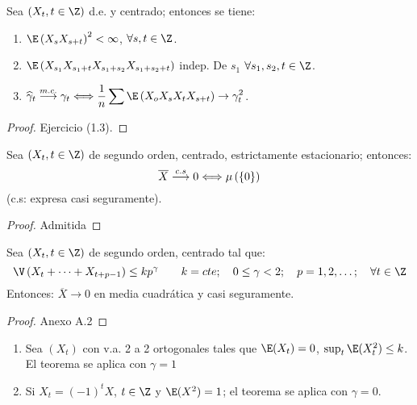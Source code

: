 \begin{teorema}
 Sea $\left( X_{t} ,t\in \Z \right)$ d.e. y centrado; entonces se tiene:
\begin{enumerate}
 \item $\E\left( {X_{s} X_{s+t} } \right)^{2}<\infty $, $\forall 
s,t\in \Z$.

\item $\E\left(X_{s_{1} } X_{s_{1} +t} X_{s_{1} +s_{2} } X_{s_{1} 
+s_{2} +t} \right)$ indep. De $s_{1}$ $ \forall s_{1} ,s_{2} 
,t\in \Z$.

\item $\displaystyle\widehat{\gamma}_{t} \buildrel {m.c.} \over 
\longrightarrow \gamma_{t} \Longleftrightarrow \frac{1}{n}\sum 
{\E\left( {X_{o} X_{s} X_{t} X_{s+t} } \right)\to \gamma_{t}^{2} } $.
\end{enumerate}
\end{teorema}

\begin{proof}
 Ejercicio (1.3).
\end{proof}

\begin{teorema}
Sea $\left( X_{t} ,t\in \Z \right)$ de segundo orden, centrado, estrictamente estacionario; entonces:
\[
\overline{X}\buildrel {c.s} \over \longrightarrow 0\Longleftrightarrow \mu \left( 
\left\{ 0 \right\} \right)
\]
(c.s: expresa casi seguramente).
\end{teorema}

\begin{proof}
 Admitida
\end{proof}


\begin{teorema}
Sea $\left(X_{t} ,t\in \Z \right)$ de segundo orden, centrado tal 
que:
\[
\V\left( {X_{t} +\cdots+X_{t+p-1} } \right)\leq kp^{\gamma }
\qquad
k=cte;
\quad
0\leq \gamma <2;
\quad
p=1,2,\ldots;\quad \forall t\in\Z
\]
Entonces: $\overline{{X}}\to 0$ en media cuadr\'{a}tica y casi seguramente.
\end{teorema}

\begin{proof}
 Anexo A.2
\end{proof}

\begin{ejemplo}
\begin{enumerate}
\item Sea $\left( {X_{t} } \right)$ con v.a. 2 a 2 ortogonales tales que $\E(X_{t})=0$, $\sup_{t} \E(X_{t}^{2}) \leq k$. El teorema se aplica con $\gamma =1$
\item Si $X_{t} =\left( {-1} \right)^{t}X$, $t\in 
\Z$ y $\E(X^{2})=1$; el teorema se aplica con $\gamma =0$.
\end{enumerate}
\end{ejemplo}

